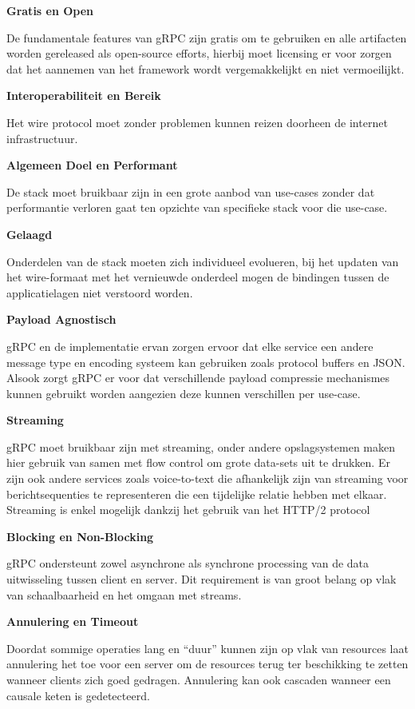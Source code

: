 \textbf{Gratis en Open}

De fundamentale features van gRPC zijn gratis om te gebruiken en  alle artifacten worden gereleased als open-source efforts, hierbij moet licensing er voor zorgen dat het aannemen van het framework wordt vergemakkelijkt en niet vermoeilijkt.

\textbf{Interoperabiliteit en Bereik}

Het wire protocol moet zonder problemen kunnen reizen doorheen de internet infrastructuur.

\textbf{Algemeen Doel en Performant}

De stack moet bruikbaar zijn in een grote aanbod van use-cases zonder dat performantie verloren gaat ten opzichte van specifieke stack voor die use-case.

\textbf{Gelaagd}

Onderdelen van de stack moeten zich individueel evolueren, bij het updaten van het wire-formaat met het vernieuwde onderdeel mogen de bindingen tussen de applicatielagen niet verstoord worden.

\textbf{Payload Agnostisch}

gRPC en de implementatie ervan zorgen ervoor dat elke service  een andere message type en encoding systeem kan gebruiken zoals protocol buffers en JSON. Alsook zorgt gRPC er voor dat verschillende payload compressie mechanismes kunnen gebruikt worden aangezien deze kunnen verschillen per use-case.

\textbf{Streaming}

gRPC moet bruikbaar zijn met streaming, onder andere opslagsystemen maken hier gebruik van samen met flow control om grote data-sets uit te drukken. Er zijn ook andere services zoals voice-to-text die afhankelijk zijn van streaming voor berichtsequenties te representeren die een tijdelijke relatie hebben met elkaar. Streaming is enkel mogelijk dankzij het gebruik van het HTTP/2 protocol \autocite{Grigorik2013} 

\textbf{Blocking en Non-Blocking}

gRPC ondersteunt zowel asynchrone als synchrone processing van de data uitwisseling tussen client en server. Dit requirement is van groot belang op vlak van schaalbaarheid en het omgaan met streams.

\textbf{Annulering en Timeout}

Doordat sommige operaties lang en “duur” kunnen zijn op vlak van resources laat annulering het toe voor een server om de resources terug ter beschikking te zetten wanneer clients zich goed gedragen. Annulering kan ook cascaden wanneer een causale keten is gedetecteerd.

